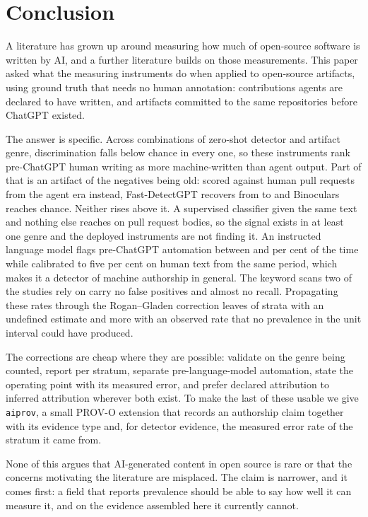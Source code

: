 \section{Conclusion}
\label{sec:conclusion}

A literature has grown up around measuring how much of open-source software is written
by AI, and a further literature builds on those measurements. This paper asked what the
measuring instruments do when applied to open-source artifacts, using ground truth that
needs no human annotation: contributions agents are declared to have written, and
artifacts committed to the same repositories before ChatGPT existed.

The answer is specific. Across \ZeroShotCells{} combinations of zero-shot detector and
artifact genre, discrimination falls below chance in every one, so these instruments
rank pre-ChatGPT human writing as more machine-written than agent output. Part of that
is an artifact of the negatives being old: scored against human pull requests from the
agent era instead, Fast-DetectGPT recovers from  to  and
Binoculars reaches chance. Neither rises above it. A supervised
classifier given the same text and nothing else reaches \CeilingAurocMax{} on pull
request bodies, so the signal exists in at least one genre and the deployed instruments
are not finding it. An instructed language model flags pre-ChatGPT automation between
\JudgeBotFprMin{} and \JudgeBotFprMax{} per cent of the time while calibrated to five
per cent on human text from the same period, which makes it a detector of machine
authorship in general. The keyword scans two of the studies rely on carry no false
positives and almost no recall. Propagating these rates through the Rogan--Gladen
correction leaves \CorrectionUndefined{} of \CorrectionCells{} strata with an undefined
estimate and \CorrectionOutOfRange{} more with an observed rate that no prevalence in
the unit interval could have produced.

The corrections are cheap where they are possible: validate on the genre being counted,
report per stratum, separate pre-language-model automation, state the operating point
with its measured error, and prefer declared attribution to inferred attribution
wherever both exist. To make the last of these usable we give \texttt{aiprov}, a small
PROV-O extension that records an authorship claim together with its evidence type and,
for detector evidence, the measured error rate of the stratum it came from.

None of this argues that AI-generated content in open source is rare or that the
concerns motivating the literature are misplaced. The claim is narrower, and it comes first:
a field that reports prevalence should be able to say how well
it can measure it, and on the evidence assembled here it currently cannot.
